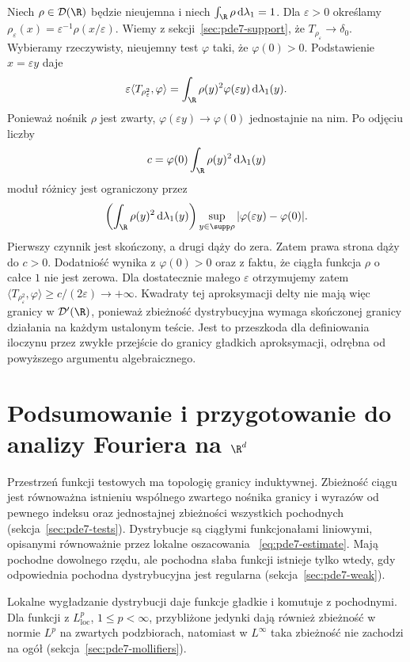 \begin{przyklad}
Niech $\rho\in\mathcal D(\R)$ będzie nieujemna
i niech $\int_\R\rho\,\mathrm d\lambda_1=1$.
Dla $\varepsilon>0$ określamy
$\rho_\varepsilon(x)=\varepsilon^{-1}\rho(x/\varepsilon)$.
Wiemy z sekcji~\ref{sec:pde7-support}, że
$T_{\rho_\varepsilon}\to\delta_0$.
Wybieramy rzeczywisty, nieujemny test $\varphi$
taki, że $\varphi(0)>0$.
Podstawienie $x=\varepsilon y$ daje
\[
 \varepsilon\langle T_{\rho_\varepsilon^2},\varphi\rangle
 =\int_\R \rho(y)^2\varphi(\varepsilon y)\,
 \mathrm d\lambda_1(y).
\]
Ponieważ nośnik $\rho$ jest zwarty,
$\varphi(\varepsilon y)\to\varphi(0)$ jednostajnie
na nim. Po odjęciu liczby
\[
 c=\varphi(0)\int_\R\rho(y)^2\,\mathrm d\lambda_1(y)
\]
moduł różnicy jest ograniczony przez
\[
 \left(\int_\R\rho(y)^2\,\mathrm d\lambda_1(y)\right)
 \sup_{y\in\supp\rho}|\varphi(\varepsilon y)-\varphi(0)|.
\]
Pierwszy czynnik jest skończony, a drugi dąży
do zera. Zatem prawa strona dąży do $c>0$.
Dodatniość wynika z $\varphi(0)>0$ oraz z faktu,
że ciągła funkcja $\rho$ o całce $1$ nie jest zerowa.
Dla dostatecznie małego $\varepsilon$ otrzymujemy
zatem
$\langle T_{\rho_\varepsilon^2},\varphi\rangle
\ge c/(2\varepsilon)\to+\infty$.
Kwadraty tej aproksymacji delty nie mają więc
granicy w $\mathcal D'(\R)$, ponieważ zbieżność
dystrybucyjna wymaga skończonej granicy działania
na każdym ustalonym teście.
Jest to przeszkoda dla definiowania iloczynu
przez zwykłe przejście do granicy gładkich
aproksymacji, odrębna od powyższego argumentu
algebraicznego.
\end{przyklad}

\section[Podsumowanie: przygotowanie do analizy Fouriera]{Podsumowanie i przygotowanie do analizy Fouriera na $\R^d$}

Przestrzeń funkcji testowych ma topologię granicy
induktywnej. Zbieżność ciągu jest równoważna
istnieniu wspólnego zwartego nośnika granicy i wyrazów
od pewnego indeksu oraz jednostajnej zbieżności
wszystkich pochodnych (sekcja~\ref{sec:pde7-tests}).
Dystrybucje są ciągłymi funkcjonałami liniowymi,
opisanymi równoważnie przez lokalne oszacowania
~\eqref{eq:pde7-estimate}. Mają pochodne dowolnego
rzędu, ale pochodna słaba funkcji istnieje tylko
wtedy, gdy odpowiednia pochodna dystrybucyjna
jest regularna (sekcja~\ref{sec:pde7-weak}).

Lokalne wygładzanie dystrybucji daje funkcje gładkie
i komutuje z pochodnymi. Dla funkcji z $L^p_{\mathrm{loc}}$,
$1\le p<\infty$, przybliżone jedynki dają również
zbieżność w normie $L^p$ na zwartych podzbiorach,
natomiast w $L^\infty$ taka zbieżność nie zachodzi
na ogół (sekcja~\ref{sec:pde7-mollifiers}).


